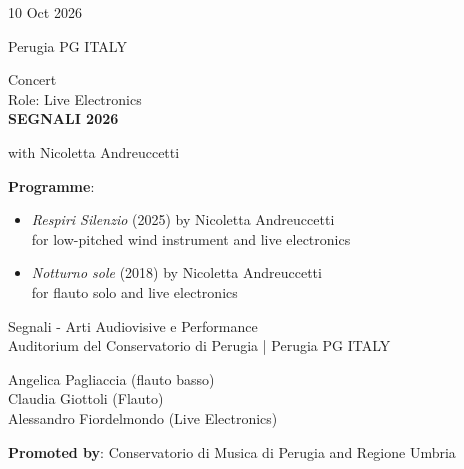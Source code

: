 \documentclass[7pt,a4paper]{article}
\begin{document}
\begin{mdframed}[
    backgroundcolor=white,
    linecolor=white,
    linewidth=0pt,
    innerleftmargin=6pt,
    innerrightmargin=6pt,
    innertopmargin=6pt,
    innerbottommargin=6pt,
    skipabove=0pt,
    skipbelow=0pt
]

\begin{minipage}[t]{0.28\textwidth}

10 Oct 2026

\scriptsize Perugia PG ITALY


\end{minipage}
\begin{minipage}[t]{0.68\textwidth}
\small Concert
\\\scriptsize Role: Live Electronics
\\ \normalsize \textbf{SEGNALI 2026}

\par\scriptsize with Nicoletta Andreuccetti
\vspace{0.25cm}

\par \scriptsize \textbf{Programme}:\par
\begin{itemize}

\item \textit{Respiri Silenzio} (2025) by Nicoletta Andreuccetti\\ for low-pitched wind instrument and live electronics

\item \textit{Notturno sole} (2018) by Nicoletta Andreuccetti\\ for flauto solo and live electronics

\end{itemize}
\vspace{0.2cm}



\small Segnali - Arti Audiovisive e Performance\\Auditorium del Conservatorio di Perugia | \scriptsize Perugia PG ITALY

\vspace{0.1cm}
\scriptsize

Angelica Pagliaccia (flauto basso)\\Claudia Giottoli (Flauto)\\Alessandro Fiordelmondo (Live Electronics)

\vspace{0.1cm}
\par \textbf{Promoted by}: Conservatorio di Musica di Perugia and Regione Umbria
\end{minipage}
\vspace{0.25cm}
\end{mdframed}
\end{document}

